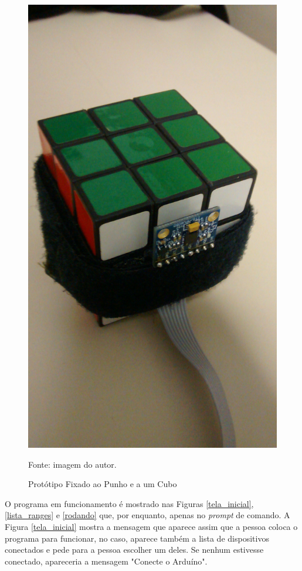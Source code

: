 \begin{figure}[h]
	 		\includegraphics[keepaspectratio=true,scale=0.1]{figuras/prototipo_2_3.jpg}
	 		\caption{Protótipo Fixado ao Punho e a um Cubo}
	 		Fonte: imagem do autor. 
	 		\label{prototipo3}	
	 	\end{figure}
	 
	O programa em funcionamento é mostrado nas Figuras \ref{tela_inicial}, \ref{lista_ranges} e \ref{rodando} que, por enquanto, apenas no \textit{prompt} de comando. A Figura \ref{tela_inicial} mostra a mensagem que aparece assim que a pessoa coloca o programa para funcionar, no caso, aparece também a lista de dispositivos conectados e pede para a pessoa escolher um deles. Se nenhum estivesse conectado, apareceria a mensagem "Conecte o Arduíno".
	
